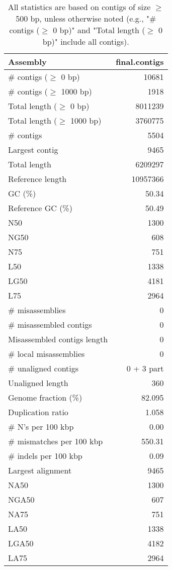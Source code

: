 \documentclass[12pt,a4paper]{article}
\begin{document}
\begin{table}[ht]
\begin{center}
\caption{All statistics are based on contigs of size $\geq$ 500 bp, unless otherwise noted (e.g., "\# contigs ($\geq$ 0 bp)" and "Total length ($\geq$ 0 bp)" include all contigs).}
\begin{tabular}{|l*{1}{|r}|}
\hline
Assembly & final.contigs \\ \hline
\# contigs ($\geq$ 0 bp) & 10681 \\ \hline
\# contigs ($\geq$ 1000 bp) & 1918 \\ \hline
Total length ($\geq$ 0 bp) & 8011239 \\ \hline
Total length ($\geq$ 1000 bp) & 3760775 \\ \hline
\# contigs & 5504 \\ \hline
Largest contig & 9465 \\ \hline
Total length & 6209297 \\ \hline
Reference length & 10957366 \\ \hline
GC (\%) & 50.34 \\ \hline
Reference GC (\%) & 50.49 \\ \hline
N50 & 1300 \\ \hline
NG50 & 608 \\ \hline
N75 & 751 \\ \hline
L50 & 1338 \\ \hline
LG50 & 4181 \\ \hline
L75 & 2964 \\ \hline
\# misassemblies & 0 \\ \hline
\# misassembled contigs & 0 \\ \hline
Misassembled contigs length & 0 \\ \hline
\# local misassemblies & 0 \\ \hline
\# unaligned contigs & 0 + 3 part \\ \hline
Unaligned length & 360 \\ \hline
Genome fraction (\%) & 82.095 \\ \hline
Duplication ratio & 1.058 \\ \hline
\# N's per 100 kbp & 0.00 \\ \hline
\# mismatches per 100 kbp & 550.31 \\ \hline
\# indels per 100 kbp & 0.09 \\ \hline
Largest alignment & 9465 \\ \hline
NA50 & 1300 \\ \hline
NGA50 & 607 \\ \hline
NA75 & 751 \\ \hline
LA50 & 1338 \\ \hline
LGA50 & 4182 \\ \hline
LA75 & 2964 \\ \hline
\end{tabular}
\end{center}
\end{table}
\end{document}

